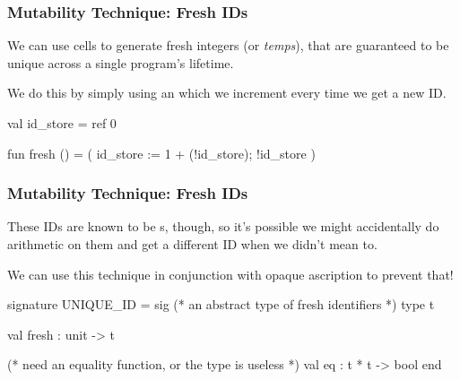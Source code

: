 \documentclass[aspectratio=169]{beamer}
\begin{document}
\begin{frame}[fragile]
  \frametitle{Mutability Technique: Fresh IDs}

  We can use  cells to generate fresh integers (or \textit{temps}), that
  are guaranteed to be unique across a single program's lifetime.

  \pause
  \vspace{\fill}


  \pause
  \vspace{\fill}

  We do this by simply using an  which we increment every time
  we get a new ID.

  \pause
  \vspace{\fill}

  \begin{codeblock}
    val id_store = ref 0

    fun fresh () =
      ( id_store := 1 + (!id_store);
        !id_store
      )
  \end{codeblock}
\end{frame}

\begin{frame}[fragile]
  \frametitle{Mutability Technique: Fresh IDs}

  These IDs are known to be s, though, so it's possible we might
  accidentally do arithmetic on them and get a different ID when we didn't
  mean to.

  \pause
  \vspace{\fill}

  We can use this technique in conjunction with opaque ascription to prevent
  that!

  \pause
  \vspace{\fill}

  \begin{codeblock}
    signature UNIQUE_ID =
      sig
        (* an abstract type of fresh identifiers *)
        type t

        val fresh : unit -> t

        (* need an equality function, or the type is useless *)
        val eq : t * t -> bool
      end
  \end{codeblock}
\end{frame}
\end{document}
